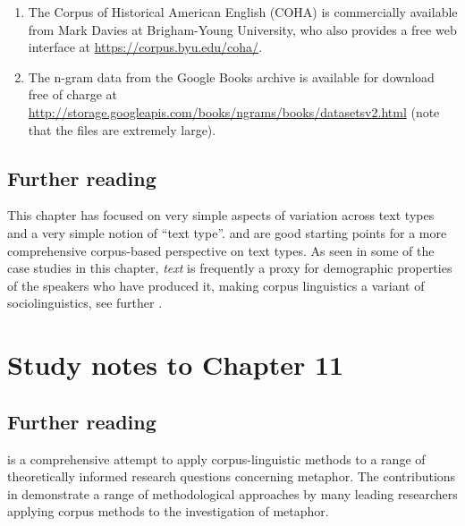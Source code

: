 \begin{enumerate}
  \item The Corpus of Historical American English (COHA) is commercially available from Mark Davies at Brigham-Young University, who also provides a free web interface at \url{https://corpus.byu.edu/coha/}.
  \item The n-gram data from the Google Books archive is available for download free of charge at \url{http://storage.googleapis.com/books/ngrams/books/datasetsv2.html} (note that the files are extremely large).
\end{enumerate}

\subsection*{Further reading}

This chapter has focused on very simple aspects of variation across text types and a very simple notion of “text type”. \citet{biber_variation_1988} and \citet{biber_typology_1989} are good starting points for a more comprehensive corpus-based perspective on text types. As seen in some of the case studies in this chapter, \textit{text} is frequently a proxy for demographic properties of the speakers who have produced it, making corpus linguistics a variant of sociolinguistics, see further \citet{baker_sociolinguistics_2010}.

\section{Study notes to Chapter 11}
\label{sec:studynotes11}

\subsection*{Further reading}

\citet{deignan_metaphor_2005} is a comprehensive attempt to apply corpus-linguistic methods to a range of theoretically informed research questions concerning metaphor. The contributions in \citet{stefanowitsch_corpus-based_2006} demonstrate a range of methodological approaches by many leading researchers applying corpus methods to the investigation of metaphor.

